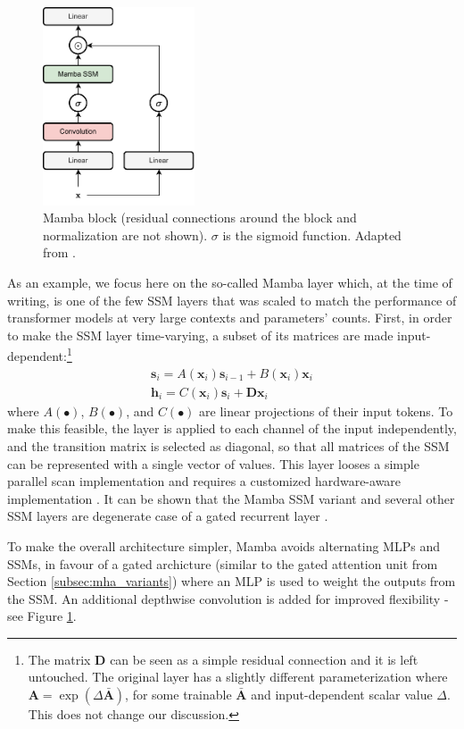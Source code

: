 \begin{figure}
    \centering
    \hspace{2em}\includegraphics[width=0.4\textwidth]{images/mamba}
    \caption{Mamba block (residual connections around the block and normalization are not shown). $\sigma$ is the sigmoid function. Adapted from \cite{gu2023mamba}.}
    \label{fig:mamba}
\end{figure}

As an example, we focus here on the so-called Mamba layer \cite{gu2023mamba} which, at the time of writing, is one of the few SSM layers that was scaled to match the performance of transformer models at very large contexts and parameters’ counts. First, in order to make the SSM layer time-varying, a subset of its matrices are made input-dependent:\footnote{The matrix $\mathbf{D}$ can be seen as a simple residual connection and it is left untouched. The original layer has a slightly different parameterization where $\mathbf{A} = \exp(\Delta \bar{\mathbf{A}})$, for some trainable $\bar{\mathbf{A}}$ and input-dependent scalar value $\Delta$. This does not change our discussion.}
%
\begin{gather}
\mathbf{s}_i = A(\mathbf{x}_i)\mathbf{s}_{i-1} + B(\mathbf{x}_i)\mathbf{x}_i \\ \mathbf{h}_i = C(\mathbf{x}_i)\mathbf{s}_i + \mathbf{D}\mathbf{x}_i 
\end{gather}
%
where $A(\bullet)$, $B(\bullet)$, and $C(\bullet)$ are linear projections of their input tokens. To make this feasible, the layer is applied to each channel of the input independently, and the transition  matrix is selected as diagonal, so that all matrices of the SSM can be represented with a single vector of values. This layer looses a simple parallel scan implementation and requires a customized hardware-aware implementation \cite{gu2023mamba}. It can be shown that the Mamba SSM variant and several other SSM layers are degenerate case of a gated recurrent layer \cite{gu2021combining,gu2023mamba}.

To make the overall architecture simpler, Mamba avoids alternating MLPs and SSMs, in favour of a gated archicture (similar to the gated attention unit from Section \ref{subsec:mha_variants}) where an MLP is used to weight the outputs from the SSM. An additional depthwise convolution is added for improved flexibility - see Figure \ref{fig:mamba}.